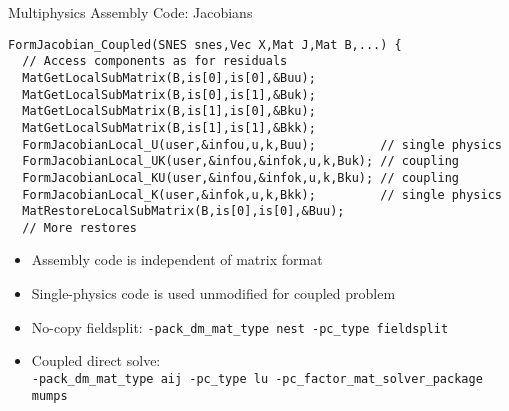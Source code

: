 \begin{frame}[fragile]{Multiphysics Assembly Code: Jacobians}
\begin{verbatim}
FormJacobian_Coupled(SNES snes,Vec X,Mat J,Mat B,...) {
  // Access components as for residuals
  MatGetLocalSubMatrix(B,is[0],is[0],&Buu);
  MatGetLocalSubMatrix(B,is[0],is[1],&Buk);
  MatGetLocalSubMatrix(B,is[1],is[0],&Bku);
  MatGetLocalSubMatrix(B,is[1],is[1],&Bkk);
  FormJacobianLocal_U(user,&infou,u,k,Buu);         // single physics
  FormJacobianLocal_UK(user,&infou,&infok,u,k,Buk); // coupling
  FormJacobianLocal_KU(user,&infou,&infok,u,k,Bku); // coupling
  FormJacobianLocal_K(user,&infok,u,k,Bkk);         // single physics
  MatRestoreLocalSubMatrix(B,is[0],is[0],&Buu);
  // More restores
\end{verbatim}
\begin{itemize}
\item Assembly code is independent of matrix format
\item Single-physics code is used unmodified for coupled problem
\item No-copy fieldsplit: \verb|-pack_dm_mat_type nest -pc_type fieldsplit|
\item Coupled direct solve: \\
  {\scriptsize \verb|-pack_dm_mat_type aij -pc_type lu -pc_factor_mat_solver_package mumps|}
\end{itemize}
\end{frame}
